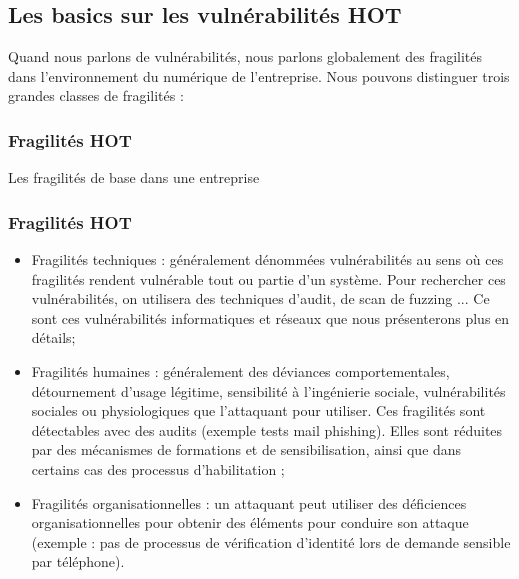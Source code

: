 
\subsection{Les basics sur les vulnérabilités HOT}

Quand nous parlons de vulnérabilités, nous parlons globalement des fragilités dans l’environnement du numérique de l’entreprise. Nous pouvons distinguer trois grandes classes de fragilités :

\begin{frame}
\frametitle<presentation>{Fragilités HOT}
Les fragilités de base dans une entreprise
\end{frame}

\begin{frame}
\frametitle<presentation>{Fragilités HOT}
\begin{itemize}
\item Fragilités techniques : généralement dénommées vulnérabilités au sens où ces fragilités rendent vulnérable tout ou partie d’un système. Pour rechercher ces vulnérabilités, on utilisera des techniques d’audit, de scan de fuzzing ... Ce sont ces vulnérabilités informatiques et réseaux que nous présenterons plus en détails;
\item Fragilités humaines : généralement des déviances comportementales, détournement d’usage légitime, sensibilité à l’ingénierie sociale, vulnérabilités sociales ou physiologiques que l’attaquant pour utiliser. Ces fragilités sont détectables avec des audits (exemple tests mail phishing). Elles sont réduites par des mécanismes de formations et de sensibilisation, ainsi que dans certains cas des processus d’habilitation ;
\item Fragilités organisationnelles : un attaquant peut utiliser des déficiences organisationnelles pour obtenir des éléments pour conduire son attaque (exemple : pas de processus de vérification d’identité lors de demande sensible par téléphone).
\end{itemize}
\end{frame}



